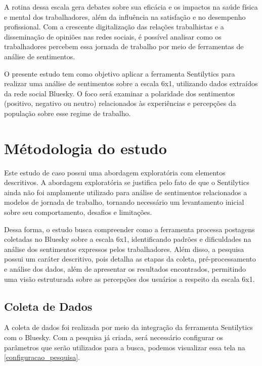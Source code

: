 \documentclass[
	12pt,				%
	oneside,			%
	a4paper,			%
	english,			%
	french,				%
	spanish,			%
	brazil				%
	]{abntex2}
\begin{document}
A rotina dessa escala gera debates sobre sua eficácia e os impactos na
saúde física e mental dos trabalhadores, além da influência na
satisfação e no desempenho profissional. Com a crescente digitalização
das relações trabalhistas e a disseminação de opiniões nas redes
sociais, é possível analisar como os trabalhadores percebem essa jornada
de trabalho por meio de ferramentas de análise de sentimentos.

O presente estudo tem como objetivo aplicar a ferramenta Sentilytics
para realizar uma análise de sentimentos sobre a escala 6x1, utilizando
dados extraídos da rede social Bluesky. O foco será examinar a
polaridade dos sentimentos (positivo, negativo ou neutro) relacionados
às experiências e percepções da população sobre esse regime de trabalho.

\hypertarget{muxe9todologia-do-estudo}{%
\section{Métodologia do estudo}\label{muxe9todologia-do-estudo}}

Este estudo de caso possui uma abordagem exploratória com elementos
descritivos. A abordagem exploratória se justifica pelo fato de que o
Sentilytics ainda não foi amplamente utilizado para análise de
sentimentos relacionados a modelos de jornada de trabalho, tornando
necessário um levantamento inicial sobre seu comportamento, desafios e
limitações.

Dessa forma, o estudo busca compreender como a ferramenta processa
postagens coletadas no Bluesky sobre a escala 6x1, identificando padrões
e dificuldades na análise dos sentimentos expressos pelos trabalhadores.
Além disso, a pesquisa possui um caráter descritivo, pois detalha as
etapas da coleta, pré-processamento e análise dos dados, além de
apresentar os resultados encontrados, permitindo uma visão estruturada
sobre as percepções dos usuários a respeito da escala 6x1.

\hypertarget{coleta-de-dados}{%
\subsection{Coleta de Dados}\label{coleta-de-dados}}

A coleta de dados foi realizada por meio da integração da ferramenta
Sentilytics com o Bluesky. Com a pesquisa já criada, será necessário
configurar os parâmetros que serão utilizados para a busca, podemos
visualizar essa tela na \autoref{configuracao_pesquisa}.
\end{document}
